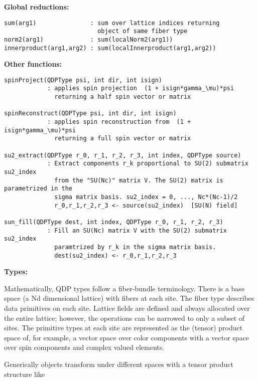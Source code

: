 \documentclass[12pt,letterpaper]{article}
\begin{document}
\medskip


\noindent
{\bf\large Global reductions:}

\begin{verbatim}
sum(arg1)               : sum over lattice indices returning 
                          object of same fiber type
norm2(arg1)             : sum(localNorm2(arg1))
innerproduct(arg1,arg2) : sum(localInnerproduct(arg1,arg2))
\end{verbatim}


\medskip

\noindent
{\bf\large Other functions:}

\begin{verbatim}
spinProject(QDPType psi, int dir, int isign)
		    : applies spin projection  (1 + isign*gamma_\mu)*psi
		      returning a half spin vector or matrix

spinReconstruct(QDPType psi, int dir, int isign)
		    : applies spin reconstruction from  (1 + isign*gamma_\mu)*psi
		      returning a full spin vector or matrix

su2_extract(QDPType r_0, r_1, r_2, r_3, int index, QDPType source)
		    : Extract components r_k proportional to SU(2) submatrix su2_index
		      from the "SU(Nc)" matrix V. The SU(2) matrix is parametrized in the
		      sigma matrix basis. su2_index = 0, ..., Nc*(Nc-1)/2
		      r_0,r_1,r_2,r_3 <- source(su2_index)  [SU(N) field]

sun_fill(QDPType dest, int index, QDPType r_0, r_1, r_2, r_3)
		    : Fill an SU(Nc) matrix V with the SU(2) submatrix su2_index
		      paramtrized by r_k in the sigma matrix basis.
		      dest(su2_index) <- r_0,r_1,r_2,r_3
\end{verbatim}

\bigskip


\noindent
{\bf\large Types:}

Mathematically, QDP types follow a fiber-bundle terminology.  There is
a base space (a Nd dimensional lattice) with fibers at each site.  The
fiber type describes data primitives on each site.  Lattice fields are
defined and always allocated over the entire lattice; however, the
operations can be narrowed to only a subset of sites.  The primitive
types at each site are represented as the (tensor) product space of,
for example, a vector space over color components with a vector space
over spin components and complex valued elements.

Generically objects transform under different spaces with a tensor
product structure like
\end{document}
